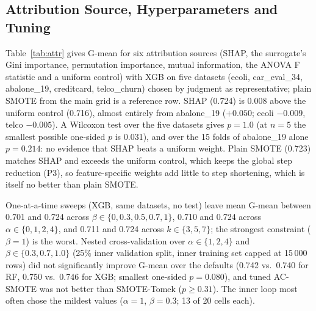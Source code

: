 \documentclass[conference,a4paper]{IEEEtran}
\newcommand{\acs}{AC-SMOTE}
\newcommand{\gmean}{\mbox{G-mean}}
\begin{document}
\begin{table}[t]
\caption{Equivalence of \acs{} and SMOTE on dataset-level \gmean{} ($N=10$). MDD: minimum difference detectable at 80\% power. $p_{\delta}$: TOST $p$ at margin $\pm\delta$, Holm-adjusted across settings.}\label{tab:equiv}
\centering\footnotesize
\setlength{\tabcolsep}{2.5pt}

\end{table}

\subsection{Attribution Source, Hyperparameters and Tuning}\label{sec:tuning}
Table~\ref{tab:attr} gives \gmean{} for six attribution sources (SHAP, the surrogate's Gini importance, permutation importance, mutual information, the ANOVA F statistic and a uniform control) with XGB on five datasets (ecoli, car\_eval\_34, abalone\_19, creditcard, telco\_churn) chosen by judgment as representative; plain SMOTE from the main grid is a reference row. SHAP (0.724) is 0.008 above the uniform control (0.716), almost entirely from abalone\_19 ($+0.050$; ecoli $-0.009$, telco $-0.005$). A Wilcoxon test over the five datasets gives $p=1.0$ (at $n=5$ the smallest possible one-sided $p$ is 0.031), and over the 15 folds of abalone\_19 alone $p=0.214$: no evidence that SHAP beats a uniform weight. Plain SMOTE (0.723) matches SHAP and exceeds the uniform control, which keeps the global step reduction (P3), so feature-specific weights add little to step shortening, which is itself no better than plain SMOTE.

\begin{table}[t]
\caption{\gmean{} by attribution source (XGB, five datasets, mean over 15 folds)}\label{tab:attr}
\centering\footnotesize
\setlength{\tabcolsep}{4.5pt}

\end{table}

One-at-a-time sweeps (XGB, same datasets, no test) leave mean \gmean{} between 0.701 and 0.724 across $\beta\in\{0,0.3,0.5,0.7,1\}$, 0.710 and 0.724 across $\alpha\in\{0,1,2,4\}$, and 0.711 and 0.724 across $k\in\{3,5,7\}$; the strongest constraint ($\beta=1$) is the worst. Nested cross-validation over $\alpha\in\{1,2,4\}$ and $\beta\in\{0.3,0.7,1.0\}$ (25\% inner validation split, inner training set capped at 15\,000 rows) did not significantly improve \gmean{} over the defaults (0.742 vs.\ 0.740 for RF, 0.750 vs.\ 0.746 for XGB; smallest one-sided $p=0.080$), and tuned \acs{} was not better than SMOTE-Tomek ($p\ge 0.31$). The inner loop most often chose the mildest values ($\alpha=1$, $\beta=0.3$; 13 of 20 cells each).
\end{document}
